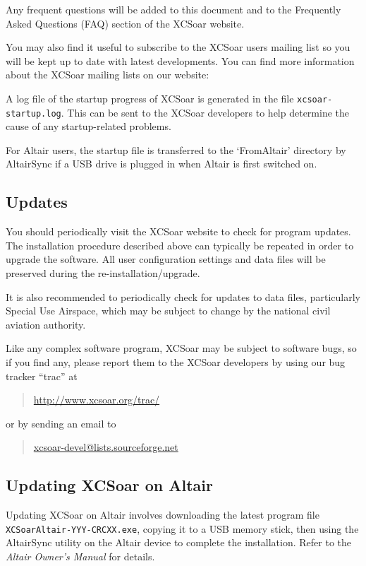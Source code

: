 \documentclass[a4paper,12pt]{refrep}
\begin{document}
Any frequent questions will be added to this document and to the Frequently
Asked Questions (FAQ) section of the XCSoar website.

You may also find it useful to subscribe to the XCSoar users mailing
list so you will be kept up to date with latest developments. You can find more
information about the XCSoar mailing lists on our website:
\begin{quote}
\xcsoarwebsite
\end{quote}

A log file of the startup progress of XCSoar is generated in the file
\verb|xcsoar-startup.log|. This can be sent to the XCSoar developers
to help determine the cause of any startup-related problems.

For Altair users, the startup file is transferred to the `FromAltair'
directory by AltairSync if a USB drive is plugged in when Altair is
first switched on.

\subsection*{Updates}
You should periodically visit the XCSoar website to check for program
updates. The installation procedure described above can typically be
repeated in order to upgrade the software.  All user configuration
settings and data files will be preserved during the
re-installation/upgrade.

It is also recommended to periodically check for updates to data
files, particularly Special Use Airspace, which may be subject to
change by the national civil aviation authority.

Like any complex software program, XCSoar may be subject to software
bugs, so if you find any, please report them to the XCSoar developers
by using our bug tracker ``trac'' at 
\begin{quote}
\url{http://www.xcsoar.org/trac/}
\end{quote}
or by sending an email to
\begin{quote}
\url{xcsoar-devel@lists.sourceforge.net}
\end{quote} 

\subsection*{Updating XCSoar on Altair}
Updating XCSoar on Altair involves downloading the latest program file
{\tt XCSoarAltair-YYY-CRCXX.exe}, copying it to a USB memory stick,
then using the AltairSync utility on the Altair device to complete the
installation.  Refer to the {\em Altair Owner's Manual} for details.
\end{document}
